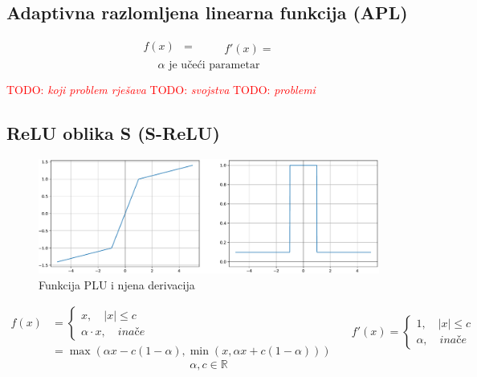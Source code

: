 \documentclass[times, utf8, numeric, diplomski]{fer}
\def\realnum{\mathbb{R}}
\def\otherwise{\textit{inače}}
\def\TODO#1{\noindent\textcolor{red}{TODO: \textit{#1}}\newline}
\def\todo#1{\TODO{#1}}
\def\todoimg#1{\begin{center} \textcolor{red}{\big[ IMAGE: \textit{#1} \big]} \end{center}}
\begin{document}
\subsection{Adaptivna razlomljena linearna funkcija (APL)}

\todoimg{}

\begin{equation}
\begin{split}
f(x) &=  \\
\end{split}
\qquad
\begin{split}
f'(x) = 
\end{split}
\end{equation}
\begin{equation*}
\alpha \text{ je učeći parametar}
\end{equation*}

\todo{koji problem rješava}
\todo{svojstva}
\todo{problemi}

\subsection{ReLU oblika S (S-ReLU)}

\begin{figure}[H]
\includegraphics[width=\textwidth]{PLU.pdf}
\centering
\caption{Funkcija PLU i njena derivacija}
\end{figure}

\begin{equation}
\begin{split}
f(x) &=
\begin{cases}
x, \quad |x| \leq c \\
\alpha \cdot x, \quad \otherwise
\end{cases} \\
&= \max(\alpha x - c(1-\alpha), \min(x, \alpha x + c (1-\alpha)))
\end{split}
\quad
\begin{split}
f'(x) =
\begin{cases}
1, \quad |x| \leq c \\
\alpha, \quad \otherwise
\end{cases}
\end{split}
\end{equation}
\begin{equation*}
\alpha, c \in \realnum
\end{equation*}
\end{document}
